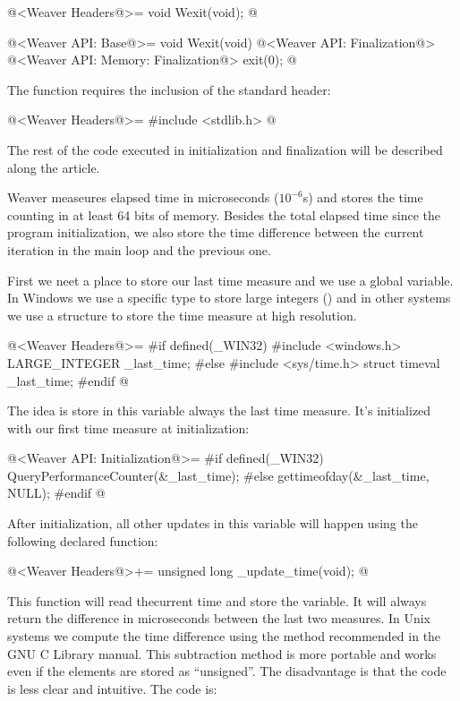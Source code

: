 \iniciocodigo
@<Weaver Headers@>=
void Wexit(void);
@
\fimcodigo

\iniciocodigo
@<Weaver API: Base@>=
void Wexit(void){
  @<Weaver API: Finalization@>
  @<Weaver API: Memory: Finalization@>
  exit(0);
}
@
\fimcodigo

The  function requires the inclusion of the standard
header:

\iniciocodigo
@<Weaver Headers@>=
#include <stdlib.h>
@
\fimcodigo

The rest of the code executed in initialization and finalization will
be described along the article.


Weaver measeures elapsed time in microseconds ($10^{-6}$s) and stores
the time counting in at least 64 bits of memory. Besides the total
elapsed time since the program initialization, we also store the time
difference between the current iteration in the main loop and the
previous one.

First we neet a place to store our last time measure and we use a
global variable. In Windows we use a specific type to store large
integers () and in other systems we use a
 structure to store the time measure at high
resolution.


\iniciocodigo
@<Weaver Headers@>=
#if defined(_WIN32)
#include <windows.h>
LARGE_INTEGER _last_time;
#else
#include <sys/time.h>
struct timeval _last_time;
#endif
@
\fimcodigo

The idea is store in this variable always the last time measure. It's
initialized with our first time measure at initialization:

\iniciocodigo
@<Weaver API: Initialization@>=
#if defined(_WIN32)
QueryPerformanceCounter(&_last_time);
#else
gettimeofday(&_last_time, NULL);
#endif
@
\fimcodigo

After initialization, all other updates in this variable will happen
using the following declared function:

\iniciocodigo
@<Weaver Headers@>+=
unsigned long _update_time(void);
@
\fimcodigo

This function will read thecurrent time and store the variable. It
will always return the difference in microseconds between the last two
measures. In Unix systems we compute the time difference using the
method recommended in the GNU C Library manual. This subtraction
method is more portable and works even if the 
elements are stored as ``unsigned''. The disadvantage is that the code
is less clear and intuitive. The code is:


